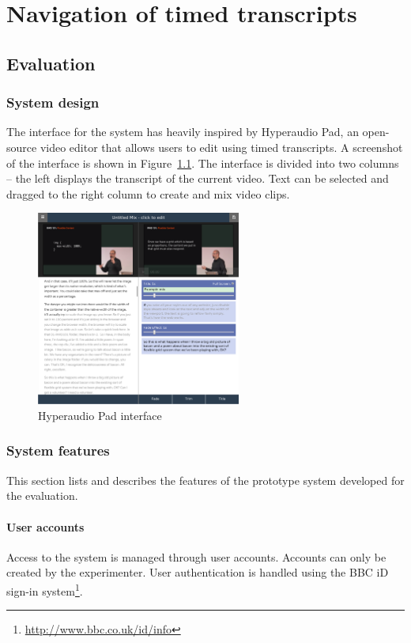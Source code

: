 \chapter{Navigation of timed transcripts}

\section{Evaluation}

\subsection{System design}
The interface for the system has heavily inspired by Hyperaudio Pad, an
open-source video editor that allows users to edit using timed transcripts. A
screenshot of the interface is shown in Figure~\ref{fig:hyperaudio-pad}. The
interface is divided into two columns -- the left displays the transcript of
the current video. Text can be selected and dragged to the right column to
create and mix video clips.

\begin{figure}[ht]
  \centering
  \includegraphics[width=0.6\textwidth]{figs/hyperaudio-pad-example.png}
  \caption{Hyperaudio Pad interface}
  \label{fig:hyperaudio-pad}
\end{figure}

\subsection{System features}
This section lists and describes the features of the prototype system developed
for the evaluation.

\subsubsection{User accounts}
Access to the system is managed through user accounts. Accounts can only be
created by the experimenter. User authentication is handled using the BBC iD
sign-in system\footnote{\url{http://www.bbc.co.uk/id/info}}.

